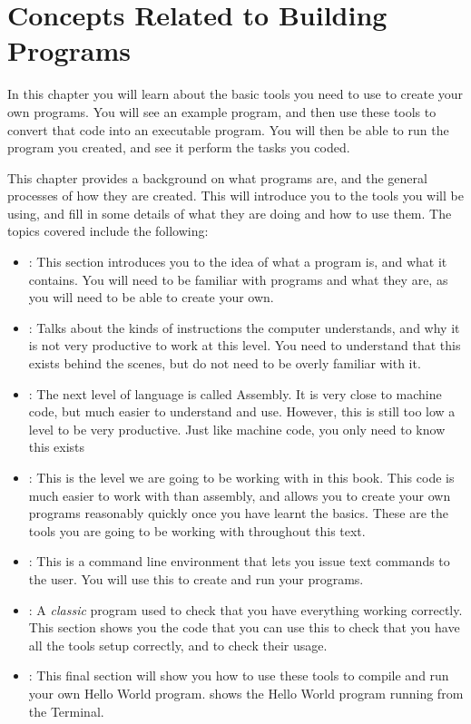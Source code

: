 \clearpage
\section{Concepts Related to Building Programs} %
\label{sec:concepts_related_to_building_programs}

In this chapter you will learn about the basic tools you need to use to create your own programs. You will see an example program, and then use these tools to convert that code into an executable program. You will then be able to run the program you created, and see it perform the tasks you coded.

This chapter provides a background on what programs are, and the general processes of how they are created. This will introduce you to the tools you will be using, and fill in some details of what they are doing and how to use them. The topics covered include the following:
\begin{itemize}
  \item {}: This section introduces you to the idea of what a program is, and what it contains. You will need to be familiar with programs and what they are, as you will need to be able to create your own.
  \item {}: Talks about the kinds of instructions the computer understands, and why it is not very productive to work at this level. You need to understand that this exists behind the scenes, but do not need to be overly familiar with it.
  \item {}: The next level of language is called Assembly. It is very close to machine code, but much easier to understand and use. However, this is still too low a level to be very productive. Just like machine code, you only need to know this exists
  \item {}: This is the level we are going to be working with in this book. This code is much easier to work with than assembly, and allows you to create your own programs reasonably quickly once you have learnt the basics. These are the tools you are going to be working with throughout this text.
  \item {}: This is a command line environment that lets you issue text commands to the user. You will use this to create and run your programs.
  \item {}: A \emph{classic} program used to check that you have everything working correctly. This section shows you the code that you can use this to check that you have all the tools setup correctly, and to check their usage.
  \item {}: This final section will show you how to use these tools to compile and run your own Hello World program.  shows the Hello World program running from the Terminal.
\end{itemize}

